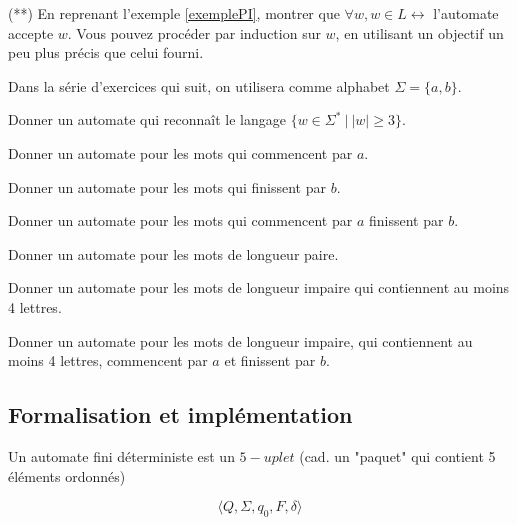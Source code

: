 \begin{exercice} (**) En reprenant l'exemple \ref{exemplePI}, montrer que $\forall w, w \in L \leftrightarrow$ l'automate accepte $w$. Vous pouvez procéder par induction sur $w$, en utilisant un objectif un peu plus précis que celui fourni.
\end{exercice}

Dans la série d'exercices qui suit, on utilisera comme alphabet $\Sigma = \{a,b\}$.

\begin{exercice}
Donner un automate qui reconnaît le langage $\{w \in \Sigma^*~|~|w| \geq 3\}$. 
\end{exercice}

\begin{exercice}
Donner un automate pour les mots qui commencent par $a$.
\end{exercice}

\begin{exercice}
Donner un automate pour les mots qui finissent par $b$.
\end{exercice}

\begin{exercice}
Donner un automate pour les mots qui commencent par $a$ finissent par $b$.
\end{exercice}


\begin{exercice}
Donner un automate pour les mots de longueur paire.
\end{exercice}

\begin{exercice}
Donner un automate pour les mots de longueur impaire qui contiennent au moins 4 lettres.
\end{exercice}

\begin{exercice}
Donner un automate pour les mots de longueur impaire, qui contiennent au moins 4 lettres, commencent par $a$ et finissent par $b$.
\end{exercice}

\subsection{Formalisation et implémentation}

Un automate fini déterministe est un $5-uplet$ (cad. un "paquet" qui contient 5 éléments ordonnés)

\[
\big \langle Q,\Sigma,q_0,F,\delta \big \rangle
\]

